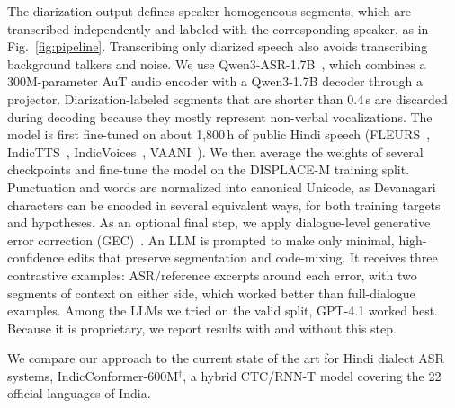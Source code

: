\documentclass{article}
\begin{document}
The diarization output defines speaker-homogeneous segments, which are transcribed independently and labeled with the corresponding speaker, as in Fig.~\ref{fig:pipeline}.
Transcribing only diarized speech also avoids transcribing background talkers and noise.
We use Qwen3-ASR-1.7B~\cite{shi2026qwen3asrtechnicalreport}, which combines a 300M-parameter AuT audio encoder with a Qwen3-1.7B decoder through a projector.
Diarization-labeled segments that are shorter than 0.4\,s are discarded during decoding because they mostly represent non-verbal vocalizations. 
The model is first fine-tuned on about 1,800\,h of public Hindi speech (FLEURS~\cite{fleurs2022arxiv}, IndicTTS~\cite{indictts2023}, IndicVoices~\cite{DBLP:conf/acl/JavedNGJBMSAFPR24}, VAANI~\cite{vaani2025}).
We then average the weights of several checkpoints and fine-tune the model on the DISPLACE-M training split.
Punctuation and words are normalized into canonical Unicode, as Devanagari characters can be encoded in several equivalent ways, for both training targets and hypotheses.
As an optional final step, we apply dialogue-level generative error correction (GEC)~\cite{chen2023hyporadise}. An LLM is prompted to make only minimal, high-confidence edits that preserve segmentation and code-mixing. It receives three contrastive examples: ASR/reference excerpts around each error, with two segments of context on either side, which worked better than full-dialogue examples.
Among the LLMs we tried on the valid split, GPT-4.1 worked best. Because it is proprietary, we report results with and without this step.

We compare our approach to the current state of the art for Hindi dialect ASR systems, IndicConformer-600M\hyperlink{fn:indic}{$^\dagger$}, a hybrid CTC/RNN-T model covering the 22 official languages of India.


\end{document}
